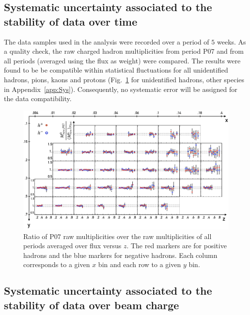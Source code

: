 
\subsection{Systematic uncertainty associated to the stability of data over time}

The data samples used in the analysis were recorded over a period of $5$ weeks. As a quality check, the raw charged hadron multiplicities from period P$07$ and from all periods (averaged using the flux as weight) were compared. The results were found to be be compatible within statistical fluctuations for all unidentified hadrons, pions, kaons and protons (Fig.~\ref{pic:hMultTime} for unidentified hadrons, other species in Appendix~\ref{app:Sys}). Consequently, no systematic error will be assigned for the data compatibility.

\begin{figure}
  \centering
	\includegraphics[scale=0.7]{./gfx/SysTimeMult.png}
	\caption{Ratio of P$07$ raw multiplicities over the raw multiplicities of all periods averaged over flux versus $z$. The red markers are for positive hadrons and the blue markers for negative hadrons. Each column corresponds to a given $x$ bin and each row to a given $y$ bin.}
	\label{pic:hMultTime}
\end{figure}


\subsection{Systematic uncertainty associated to the stability of data over beam charge}

